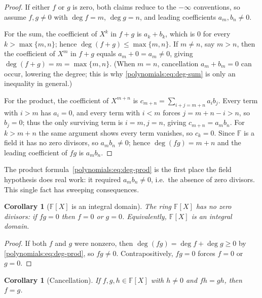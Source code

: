 \documentclass[11pt,a4paper]{article}
\newtheorem{corollary}[theorem]{Corollary}
\theoremstyle{definition}
\theoremstyle{remark}
\newcommand{\F}{\ensuremath{\mathbb{F}}}
\begin{document}
\begin{proof}
If either \(f\) or \(g\) is zero, both claims reduce to the \(-\infty\)
conventions, so assume \(f, g \neq 0\) with \(\deg f = m\), \(\deg g = n\), and
leading coefficients \(a_m, b_n \neq 0\).

For the sum, the coefficient of \(X^k\) in \(f + g\) is \(a_k + b_k\), which is
\(0\) for every \(k > \max\{m,n\}\); hence \(\deg(f+g) \le \max\{m,n\}\). If
\(m \neq n\), say \(m > n\), then the coefficient of \(X^m\) in \(f+g\) equals
\(a_m + 0 = a_m \neq 0\), giving \(\deg(f+g) = m = \max\{m,n\}\). (When
\(m = n\), cancellation \(a_m + b_m = 0\) can occur, lowering the degree; this is
why \eqref{polynomials:eq:deg-sum} is only an inequality in general.)

For the product, the coefficient of \(X^{m+n}\) is
\(c_{m+n} = \sum_{i+j = m+n} a_i b_j\). Every term with \(i > m\) has
\(a_i = 0\), and every term with \(i < m\) forces \(j = m+n-i > n\), so
\(b_j = 0\); thus the only surviving term is \(i = m, j = n\), giving
\(c_{m+n} = a_m b_n\). For \(k > m+n\) the same argument shows every term
vanishes, so \(c_k = 0\). Since \(\F\) is a field it has no zero divisors, so
\(a_m b_n \neq 0\); hence \(\deg(fg) = m + n\) and the leading coefficient of
\(fg\) is \(a_m b_n\).
\end{proof}

The product formula~\eqref{polynomials:eq:deg-prod} is the first place the field
hypothesis does real work: it required \(a_m b_n \neq 0\), i.e.\ the
absence of zero divisors. This single fact has sweeping consequences.

\begin{corollary}[{\(\F[X]\) is an integral domain}]\label{polynomials:cor:domain}
The ring \(\F[X]\) has no zero divisors: if \(f g = 0\) then \(f = 0\) or
\(g = 0\). Equivalently, \(\F[X]\) is an integral domain.
\end{corollary}

\begin{proof}
If both \(f\) and \(g\) were nonzero, then \(\deg(fg) = \deg f + \deg g \ge 0\)
by \eqref{polynomials:eq:deg-prod}, so \(fg \neq 0\). Contrapositively,
\(fg = 0\) forces \(f = 0\) or \(g = 0\).
\end{proof}

\begin{corollary}[Cancellation]\label{polynomials:cor:cancellation}
If \(f, g, h \in \F[X]\) with \(h \neq 0\) and \(f h = g h\), then \(f = g\).
\end{corollary}
\end{document}
